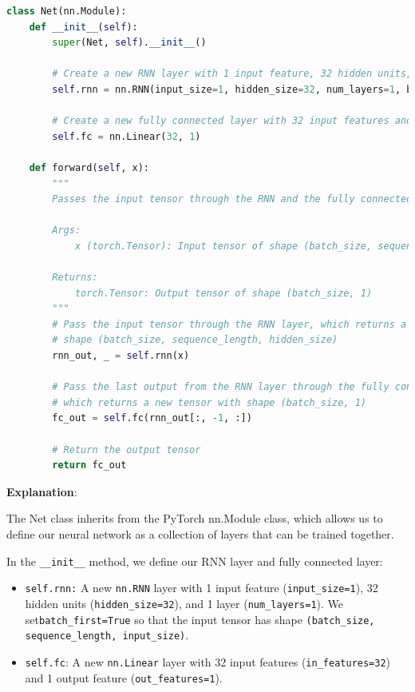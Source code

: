 \begin{lstlisting}[language=Python]
class Net(nn.Module):
    def __init__(self):
        super(Net, self).__init__()

        # Create a new RNN layer with 1 input feature, 32 hidden units, and 1 layer
        self.rnn = nn.RNN(input_size=1, hidden_size=32, num_layers=1, batch_first=True)

        # Create a new fully connected layer with 32 input features and 1 output feature
        self.fc = nn.Linear(32, 1)

    def forward(self, x):
        """
        Passes the input tensor through the RNN and the fully connected layer.

        Args:
            x (torch.Tensor): Input tensor of shape (batch_size, sequence_length, input_size)

        Returns:
            torch.Tensor: Output tensor of shape (batch_size, 1)
        """
        # Pass the input tensor through the RNN layer, which returns a new tensor with
        # shape (batch_size, sequence_length, hidden_size)
        rnn_out, _ = self.rnn(x)

        # Pass the last output from the RNN layer through the fully connected layer,
        # which returns a new tensor with shape (batch_size, 1)
        fc_out = self.fc(rnn_out[:, -1, :])

        # Return the output tensor
        return fc_out
\end{lstlisting}

\textbf{Explanation}:

The Net class inherits from the PyTorch nn.Module class, which allows us
to define our neural network as a collection of layers that can be
trained together. \newline

In the \lstinline{__init__} method, we define our RNN
layer and fully connected layer:

\begin{itemize}
\item
  \lstinline{self.rnn:} A new
  \lstinline{nn.RNN} layer with 1 input feature
  (\lstinline{input_size=1}), 32 hidden units
  (\lstinline{hidden_size=32}), and 1 layer
  (\lstinline{num_layers=1}). We
  set\lstinline{batch_first=True} so that the input
  tensor has shape
  \lstinline{(batch_size, sequence_length, input_size)}.
\item
  \lstinline{self.fc}: A new
  \lstinline{nn.Linear} layer with 32 input features
  (\lstinline{in_features=32}) and 1 output feature
  (\lstinline{out_features=1}).
\end{itemize}

